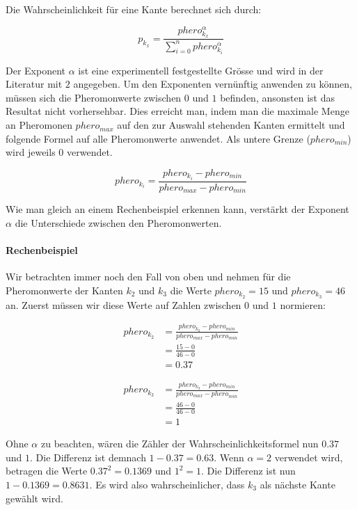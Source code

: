 Die Wahrscheinlichkeit für eine Kante berechnet sich durch:

\[ p_{k_x} = \frac{phero_{k_x}^\alpha}{\sum\nolimits_{i=0}^n phero_{k_i}^\alpha} \]

Der Exponent $\alpha$ ist eine experimentell festgestellte Grösse und wird in der Literatur mit $2$ angegeben. Um den Exponenten vernünftig anwenden zu können, müssen sich die Pheromonwerte zwischen $0$ und $1$ befinden, ansonsten ist das Resultat nicht vorhersehbar. Dies erreicht man, indem man die maximale Menge an Pheromonen $phero_{max}$ auf den zur Auswahl stehenden Kanten ermittelt und folgende Formel auf alle Pheromonwerte anwendet. Als untere Grenze ($phero_{min}$) wird jeweils $0$ verwendet.

\[ phero_{k_i} = \frac{phero_{k_i} - phero_{min}}{phero_{max} - phero_{min}} \] 

Wie man gleich an einem Rechenbeispiel erkennen kann, verstärkt der Exponent $\alpha$ die Unterschiede zwischen den Pheromonwerten. 

\paragraph*{Rechenbeispiel}

Wir betrachten immer noch den Fall von oben und nehmen für die Pheromonwerte der Kanten $k_2$ und $k_3$ die Werte $phero_{k_2} = 15 $ und $phero_{k_3} = 46$ an. Zuerst müssen wir diese Werte auf Zahlen zwischen $0$ und $1$ normieren:

\begin{equation*}
\begin{split}
phero_{k_2} & = \frac{phero_{k_2} - phero_{min}}{phero_{max} - phero_{min}} \\
            & = \frac{15 - 0}{46 - 0} \\
            & = 0.37
\end{split}
\end{equation*}

\begin{equation*}
\begin{split}
phero_{k_3} & = \frac{phero_{k_3} - phero_{min}}{phero_{max} - phero_{min}} \\
            & = \frac{46 - 0}{46 - 0} \\
            & = 1
\end{split}
\end{equation*}

Ohne $\alpha$ zu beachten, wären die Zähler der Wahrscheinlichkeitsformel nun $0.37$ und $1$. Die Differenz ist demnach $1 - 0.37 = 0.63$. Wenn $\alpha = 2$ verwendet wird, betragen die Werte $0.37^2 = 0.1369$ und $1^2 = 1$. Die Differenz ist nun $1 - 0.1369 = 0.8631$. Es wird also wahrscheinlicher, dass $k_3$ als nächste Kante gewählt wird.

